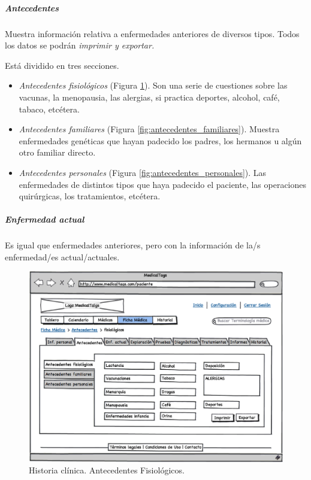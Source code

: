 		\subparagraph{Antecedentes} %
		\label{par:interface_antecedentes}
		
			Muestra información relativa a enfermedades anteriores de diversos tipos. Todos los datos se podrán \textit{imprimir y exportar.}
			
			
			Está dividido en tres secciones.
			
			\begin{itemize}
				\item \textit{Antecedentes fisiológicos} (Figura \ref{fig:antecedentes_fisiologicos}). Son una serie de cuestiones sobre las vacunas, la menopausia, las alergias, si practica deportes, alcohol, café, tabaco, etcétera.
				\item \textit{Antecedentes familiares} (Figura \ref{fig:antecedentes_familiares}). Muestra enfermedades genéticas que hayan padecido los padres, los hermanos u algún otro familiar directo. 
				
				
				\item \textit{Antecedentes personales} (Figura \ref{fig:antecedentes_personales}). Las enfermedades de distintos tipos que haya padecido el paciente, las operaciones quirúrgicas, los tratamientos, etcétera. 
			\end{itemize}
			
			\subparagraph{Enfermedad actual} %
			\label{par:enfermedad_actual}
				Es igual que enfermedades anteriores, pero con la información de la/s enfermedad/es actual/actuales.
			
			\begin{figure}[H]
			  \centering
			    \includegraphics[width=12cm]{img/eps/30_Antecedentes_pacientes.eps}
			  \caption{Historia clínica. Antecedentes Fisiológicos.}
			  \label{fig:antecedentes_fisiologicos}
			\end{figure}
			
